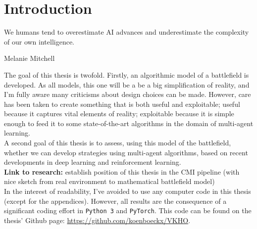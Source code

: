 \chapter{Introduction}

\epigraph{We humans tend to overestimate AI advances and underestimate the complexity of our own intelligence.} {Melanie Mitchell}

The goal of this thesis is twofold. Firstly, an algorithmic model of a battlefield is developed. As all models, this one will be a be a big simplification of reality, and I'm fully aware many criticisms about design choices can be made. However, care has been taken to create something that is both useful and exploitable; useful because it captures vital elements of reality; exploitable because it is simple enough to feed it to some state-of-the-art algorithms in the domain of multi-agent learning.\\

A second goal of this thesis is to assess, using this model of the battlefield, whether we can develop strategies using multi-agent algorithms, based on recent developments in deep learning and reinforcement learning.\\

\textbf{Link to research:} establish position of this thesis in the CMI pipeline (with nice sketch from real environment to mathematical battlefield model)\\

In the interest of readability, I've avoided to use any computer code in this thesis (except for the appendices). However, all results are the consequence of a significant coding effort in {\tt Python 3} and {\tt PyTorch}. This code can be found on the thesis' Github page: \url{https://github.com/koenboeckx/VKHO}.

%
%
%
